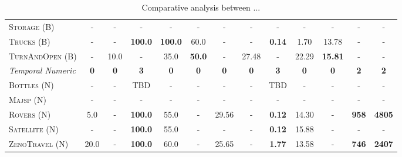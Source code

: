 \documentclass[11pt,landscape]{article}
\begin{document}
\begin{table*}[tb]
{\begin{tabular}{|l||ccccc||ccccc||c||c||}
\textsc{Storage} (B)&-&-&-&-&-&-&-&-&-&-&-&-\\
\textsc{Trucks} (B)&-&-&\textbf{100.0}&\textbf{100.0}&60.0&-&-&\textbf{0.14}&1.70&13.78&-&-\\
\textsc{TurnAndOpen} (B)&-&10.0&-&35.0&\textbf{50.0}&-&27.48&-&22.29&\textbf{15.81}&-&-
\\\hline
\textit{Temporal Numeric}&\textbf{0}&\textbf{0}&\textbf{3}&\textbf{0}&\textbf{0}&\textbf{0}&\textbf{0}&\textbf{3}&\textbf{0}&\textbf{0}&\textbf{2}&\textbf{2}\\\hline
\textsc{Bottles} (N)&-&-&TBD&-&-&-&-&TBD&-&-&-&-\\
\textsc{Majsp} (N)&-&-&-&-&-&-&-&-&-&-&-&-\\
\textsc{Rovers} (N)&5.0&-&\textbf{100.0}&55.0&-&29.56&-&\textbf{0.12}&14.30&-&\textbf{958}&\textbf{4805}\\
\textsc{Satellite} (N)&-&-&\textbf{100.0}&55.0&-&-&-&\textbf{0.12}&15.88&-&-&-\\
\textsc{ZenoTravel} (N)&20.0&-&\textbf{100.0}&60.0&-&25.65&-&\textbf{1.77}&13.58&-&\textbf{746}&\textbf{2407}
\\\hline

        \end{tabular}}
        \caption{Comparative analysis between ...}
        \label{tab:experiments}
        \end{table*}
        
\end{document}
